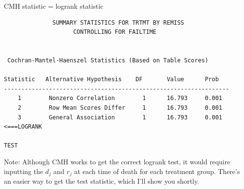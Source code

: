 \documentclass[envcountsect, 10pt, portrait, palatino]{beamer}
\begin{document}
\begin{frame}[fragile]{CMH statistic = logrank statistic}

\scriptsize
\begin{verbatim}
              SUMMARY STATISTICS FOR TRTMT BY REMISS
                    CONTROLLING FOR FAILTIME


 Cochran-Mantel-Haenszel Statistics (Based on Table Scores)

Statistic   Alternative Hypothesis    DF       Value      Prob
-----------------------------------------------------------------
    1        Nonzero Correlation        1      16.793     0.001
    2        Row Mean Scores Differ     1      16.793     0.001
    3        General Association        1      16.793     0.001 <===LOGRANK
                                                                    TEST
\end{verbatim}

\normalsize
Note: Although CMH works to get the correct logrank test, it would
require inputting the $d_j$ and $r_j$ at each time of death
for each treatment group.  There's an easier way to get the
test statistic, which I'll show you shortly.
\end{frame}
\end{document}

